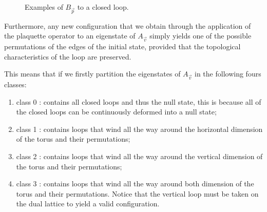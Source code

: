 \documentclass{Configuration_Files/PoliMi3i_thesis}
\begin{document}
\begin{figure}
\begin{center}

	\end{center}

\caption{Examples of $B_{\vec{p}} $ to a closed loop.}
\label{fig:applyBp}
\end{figure}


Furthermore, any new configuration that we obtain through the application of the plaquette operator to an eigenstate of $A_{\vec{v}} $ simply yields one of the possible permutations of the edges of the initial state, provided that the topological characteristics of the loop are preserved.

This means that if we firstly partition the eigenstates of $A_{\vec{v}} $ in the following fours classes: 

\begin{enumerate}
	\item class 0 : contains all closed loops and thus the null state,
	this is because all of the closed loops can be continuously deformed into a null state;
	
	\item class 1 : contains loops that wind all the way around the horizontal dimension of the torus and their permutations;
	
	\item class 2 : contains loops that wind all the way around the vertical dimension of the torus and their permutations;
	
	\item class 3 : contains loops that wind all the way around both dimension of the torus and their permutations. Notice that the vertical loop must be taken on the dual lattice to yield a valid configuration.
	
\end{enumerate}
\end{document}
